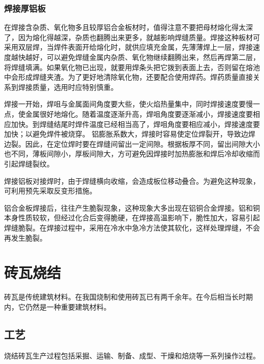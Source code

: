 \documentclass{ctexbook}
\begin{document}
\subsection{焊接厚铝板}
在焊接含杂质、氧化物多且较厚铝合金板材时，值得注意不要把母材熔化得太深了，因为熔化得越深，杂质也翻腾出来更多，就越影响焊缝质量。焊接这种板材可采用双层焊，当焊件表面开给熔化时，就供应填充金属，先薄薄焊上一层，焊接速度越快越好，可以避免焊缝金属内杂质、氧化物继续翻腾出来，然后再焊第二层，将焊缝填满。如果氧化物已出现，就要用焊条头把它拨到表面上去，否则留在熔池中会形成焊缝夹渣。为了更好地清除氧化物，还要配合使用焊药。焊药质量直接关系到焊接质量，选用时应特别慎重。

焊接一开始，焊咀与金属面间角度要大些，使火焰热量集中，同时焊接速度要慢一点，使金属很好地熔化。随着温度逐渐升高，焊咀角度要逐渐减小，焊接速度要相应加快。到焊缝结尾时焊件温度已经相当高了，焊咀角度要相应减小，焊接速度要加快；以避免焊件被烧穿。
铝膨胀系数大，焊接时容易使定位焊裂开，导致边焊边裂。因此，在定位焊时要在焊缝间留出一定间隙。根据板厚不同，留出间隙大小也不同，薄板间隙小，厚板间隙大，方可避免因焊接时加热膨胀和焊后冷却收缩而引起焊缝裂纹。

焊接铝板对接焊时，由于焊缝横向收缩，会造成板位移动叠合。为避免这种现象，可利用预先采取反变形措施。

铝合金板焊接后，往往产生脆裂现象，这种现象大多出现在铝铜合金焊接。铝和铜本身性质较软，但经过化合后变得脆硬，在焊接高温影响下，脆性加大，容易引起焊缝脆裂。在焊接过程中，采用在冷水中急冷方法使其软化，这样处理焊缝，不会再发生脆裂。








        
        
        
        





















\chapter{砖瓦烧结}
砖瓦是传统建筑材料。在我国烧制和使用砖瓦已有两千余年。在今后相当长时期内，它仍然是一种重要建筑材料。
\section{工艺}
烧结砖瓦生产过程包括采掘、运输、制备、成型、干燥和焙烧等一系列操作过程。
\end{document}
